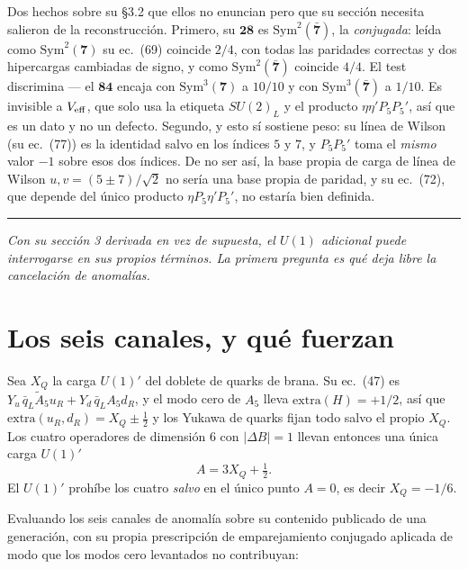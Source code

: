\documentclass[11pt,a4paper]{article}
\newcommand{\su}[1]{SU(#1)}
\newcommand{\rep}[1]{\mathbf{#1}}
\newcommand{\bridge}[1]{\par\medskip\noindent
  \textcolor{hdrblue!45}{\rule{2.2cm}{0.6pt}}\;\;\parbox[t]{0.84\textwidth}{\small\itshape
  \textcolor{hdrblue!85}{#1}}\par\medskip}
\begin{document}
Dos hechos sobre su \S3.2 que ellos no enuncian pero que su sección necesita salieron de la
reconstrucción. Primero, su $\rep{28}$ es $\mathrm{Sym}^2(\rep{\bar7})$, la \emph{conjugada}: leída
como $\mathrm{Sym}^2(\rep7)$ su ec.~(69) coincide $2/4$, con todas las paridades correctas y dos
hipercargas cambiadas de signo, y como $\mathrm{Sym}^2(\rep{\bar7})$ coincide $4/4$. El test
discrimina --- el $\rep{84}$ encaja con $\mathrm{Sym}^3(\rep7)$ a $10/10$ y con
$\mathrm{Sym}^3(\rep{\bar7})$ a $1/10$. Es invisible a $V_{\rm eff}$, que solo usa la etiqueta
$\su2_L$ y el producto $\eta\eta'P_5P_5'$, así que es un dato y no un defecto. Segundo, y esto sí
sostiene peso: su línea de Wilson (su ec.~(77)) es la identidad salvo en los índices $5$ y $7$, y
$P_5P_5'$ toma el \emph{mismo} valor $-1$ sobre esos dos índices. De no ser así, la base propia de
carga de línea de Wilson $u,v=(5\pm7)/\sqrt2$ no sería una base propia de paridad, y su ec.~(72), que
depende del único producto $\eta P_5\eta'P_5'$, no estaría bien definida.

\bridge{Con su sección 3 derivada en vez de supuesta, el $U(1)$ adicional puede interrogarse en sus
propios términos. La primera pregunta es qué deja libre la cancelación de anomalías.}

\section{Los seis canales, y qué fuerzan}\label{sec:anom}

Sea $X_Q$ la carga $U(1)'$ del doblete de quarks de brana. Su ec.~(47) es
$Y_u\,\bar q_L\tilde A_5 u_R+Y_d\,\bar q_L A_5 d_R$, y el modo cero de $A_5$ lleva
$\mathrm{extra}(H)=+1/2$, así que $\mathrm{extra}(u_R,d_R)=X_Q\pm\tfrac12$ y los Yukawa de quarks
fijan todo salvo el propio $X_Q$. Los cuatro operadores de dimensión 6 con $|\Delta B|=1$ llevan
entonces una única carga $U(1)'$
\begin{equation}\label{eq:A}
A=3X_Q+\tfrac12 .
\end{equation}
El $U(1)'$ prohíbe los cuatro \emph{salvo} en el único punto $A=0$, es decir $X_Q=-1/6$.

Evaluando los seis canales de anomalía sobre su contenido publicado de una generación, con su propia
prescripción de emparejamiento conjugado aplicada de modo que los modos cero levantados no
contribuyan:
\end{document}
